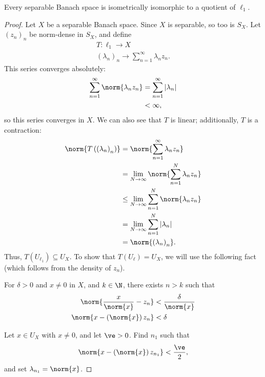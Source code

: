 \documentclass[10pt]{mypackage}
\begin{document}
\begin{proposition}
  Every separable Banach space is isometrically isomorphic to a quotient of $\ell_1$.
\end{proposition}
\begin{proof}
  Let $X$ be a separable Banach space. Since $X$ is separable, so too is $S_{X}$. Let $\left(z_n\right)_n$ be norm-dense in $S_X$, and define
  \begin{align*}
    T: \ell_1\rightarrow X\\
    \left(\lambda_n\right)_n \rightarrow \sum_{n=1}^{\infty}\lambda_nz_n.
  \end{align*}
  This series converges absolutely:
  \begin{align*}
    \sum_{n=1}^{\infty}\norm{\lambda_nz_n} &= \sum_{n=1}^{\infty}\left\vert \lambda_n \right\vert\\
                                           &<\infty,
  \end{align*}
  so this series converges in $X$. We can also see that $T$ is linear; additionally, $T$ is a contraction:
  \begin{align*}
    \norm{T\left(\left(\lambda_n\right)_n\right)} &= \norm{\sum_{n=1}^{\infty}\lambda_nz_n}\\
                                                  &= \lim_{N\rightarrow\infty}\norm{\sum_{n=1}^{N}\lambda_nz_n}\\
                                                  &\leq \lim_{N\rightarrow\infty}\sum_{n=1}^{N}\norm{\lambda_nz_n}\\
                                                  &= \lim_{N\rightarrow\infty}\sum_{n=1}^{N}\left\vert \lambda_n \right\vert\\
                                                  &= \norm{\left(\lambda_n\right)_n}.
  \end{align*}
  Thus, $T\left(U_{\ell_1}\right) \subseteq U_X$. To show that $T\left(U_{\ell}\right) = U_X$, we will use the following fact (which follows from the density of $z_n$).
  \begin{fact}
    For $\delta > 0$ and $x\neq 0$ in $X$, and $k\in \N$, there exists $n > k$ such that
    \begin{align*}
      \norm{\frac{x}{\norm{x}} - z_n} &< \frac{\delta}{\norm{x}}\\
      \norm{x - \left(\norm{x}\right)z_n} &< \delta
    \end{align*}
  \end{fact}
  Let $x\in U_X$ with $x \neq 0$, and let $\ve > 0$. Find $n_1$ such that
  \begin{align*}
    \norm{x - \left(\norm{x}\right)z_{n_1}} < \frac{\ve}{2},
  \end{align*}
  and set $\lambda_{n_1} = \norm{x}$.\newline


\end{proof}
\end{document}
